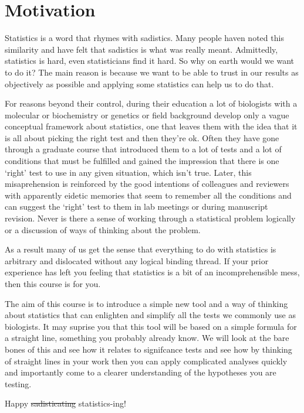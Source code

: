 \documentclass[
]{book}
\begin{document}
\hypertarget{motivation}{%
\chapter{Motivation}\label{motivation}}

Statistics is a word that rhymes with sadistics. Many people haven noted this similarity and have felt that sadistics is what was really meant. Admittedly, statistics is hard, even statisticians find it hard. So why on earth would we want to do it? The main reason is because we want to be able to trust in our results as objectively as possible and applying some statistics can help us to do that.

For reasons beyond their control, during their education a lot of biologists with a molecular or biochemistry or genetics or field background develop only a vague conceptual framework about statistics, one that leaves them with the idea that it is all about picking the right test and then they're ok. Often they have gone through a graduate course that introduced them to a lot of tests and a lot of conditions that must be fulfilled and gained the impression that there is one `right' test to use in any given situation, which isn't true. Later, this misaprehension is reinforced by the good intentions of colleagues and reviewers with apparently eidetic memories that seem to remember all the conditions and can suggest the `right' test to them in lab meetings or during manuscript revision. Never is there a sense of working through a statistical problem logically or a discussion of ways of thinking about the problem.

As a result many of us get the sense that everything to do with statistics is arbitrary and dislocated without any logical binding thread. If your prior experience has left you feeling that statistics is a bit of an incomprehensible mess, then this course is for you.

The aim of this course is to introduce a simple new tool and a way of thinking about statistics that can enlighten and simplify all the tests we commonly use as biologists. It may suprise you that this tool will be based on a simple formula for a straight line, something you probably already know. We will look at the bare bones of this and see how it relates to signifcance tests and see how by thinking of straight lines in your work then you can apply complicated analyses quickly and importantly come to a clearer understanding of the hypotheses you are testing.

Happy \sout{sadisticating} statistics-ing!
\end{document}
